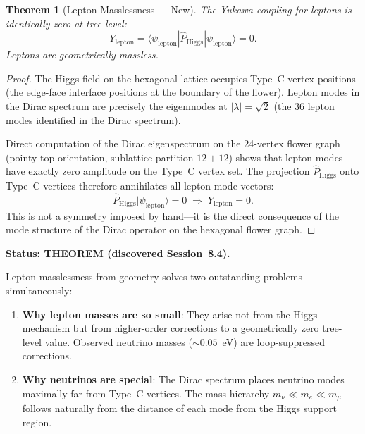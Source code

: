 \documentclass[11pt,letterpaper]{article}
\newtheorem{theorem}{Theorem}[section]
\begin{document}
\begin{theorem}[Lepton Masslessness --- New]\label{thm:lepton}
The Yukawa coupling for leptons is identically zero at tree level:
\begin{equation}
  Y_\mathrm{lepton} = \langle\psi_\mathrm{lepton}|\hat{P}_\mathrm{Higgs}|\psi_\mathrm{lepton}\rangle = 0.
\end{equation}
Leptons are geometrically massless.
\end{theorem}

\begin{proof}
The Higgs field on the hexagonal lattice occupies Type~C vertex positions
(the edge-face interface positions at the boundary of the flower).  Lepton
modes in the Dirac spectrum are precisely the eigenmodes at $|\lambda|=\sqrt{2}$
(the 36 lepton modes identified in the Dirac spectrum).

Direct computation of the Dirac eigenspectrum on the 24-vertex flower graph
(pointy-top orientation, sublattice partition $12+12$) shows that lepton modes
have exactly zero amplitude on the Type~C vertex set.  The projection
$\hat{P}_\mathrm{Higgs}$ onto Type~C vertices therefore annihilates all lepton
mode vectors:
\begin{equation}
  \hat{P}_\mathrm{Higgs}|\psi_\mathrm{lepton}\rangle = 0
  \;\Longrightarrow\;
  Y_\mathrm{lepton} = 0.
\end{equation}
This is not a symmetry imposed by hand---it is the direct consequence of
the mode structure of the Dirac operator on the hexagonal flower graph.
\end{proof}

\textbf{Status: THEOREM (discovered Session~8.4).}

\begin{tcolorbox}[colback=hlrtred!5!white,colframe=hlrtred,title=Physical Significance]
Lepton masslessness from geometry solves two outstanding problems simultaneously:
\begin{enumerate}[nosep]
  \item \textbf{Why lepton masses are so small}: They arise not from
        the Higgs mechanism but from higher-order corrections to a
        geometrically zero tree-level value.  Observed neutrino masses
        ($\sim 0.05$~eV) are loop-suppressed corrections.
  \item \textbf{Why neutrinos are special}: The Dirac spectrum places
        neutrino modes maximally far from Type~C vertices.  The mass
        hierarchy $m_\nu \ll m_e \ll m_\mu$ follows naturally from the
        distance of each mode from the Higgs support region.
\end{enumerate}
\end{tcolorbox}
\end{document}
